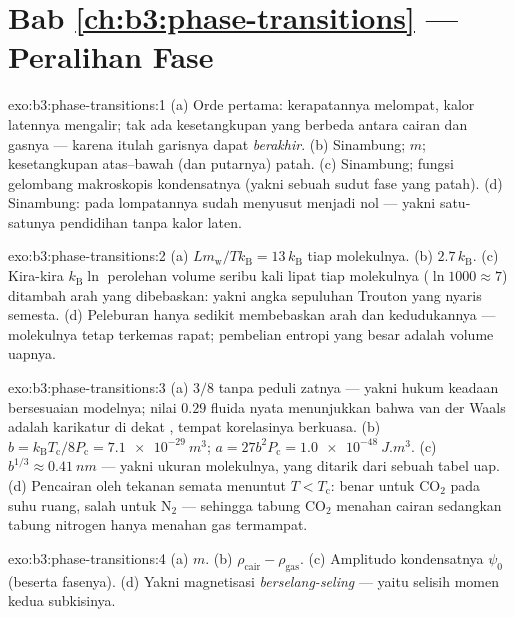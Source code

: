 \section*{Bab \ref{ch:b3:phase-transitions} --- Peralihan Fase}

\begin{solution}{exo:b3:phase-transitions:1}
(a) Orde pertama: kerapatannya melompat, kalor latennya mengalir; tak
ada kesetangkupan yang berbeda antara cairan dan gasnya --- karena
itulah garisnya dapat \emph{berakhir}. (b) Sinambung;  $m$; kesetangkupan atas--bawah (dan
putarnya) patah. (c) Sinambung; fungsi gelombang makroskopis
kondensatnya (yakni sebuah sudut fase yang patah). (d) Sinambung:
pada  lompatannya sudah menyusut menjadi nol --- yakni
satu-satunya pendidihan tanpa kalor laten.
\end{solution}

\begin{solution}{exo:b3:phase-transitions:2}
(a) $Lm_{\text{w}}/Tk_{\text{B}} = 13\,k_{\text{B}}$ tiap molekulnya.
(b) $2.7\,k_{\text{B}}$. (c) Kira-kira $k_{\text{B}}\ln$ perolehan
volume seribu kali lipat tiap molekulnya ($\ln1000 \approx 7$) ditambah
arah yang dibebaskan: yakni angka sepuluhan Trouton yang nyaris semesta. (d)
Peleburan hanya sedikit membebaskan arah dan kedudukannya --- molekulnya
tetap terkemas rapat; pembelian entropi yang besar adalah volume uapnya.
\end{solution}

\begin{solution}{exo:b3:phase-transitions:3}
(a) $3/8$ tanpa peduli zatnya --- yakni hukum keadaan bersesuaian
modelnya; nilai $0.29$ fluida nyata menunjukkan bahwa van der Waals adalah
karikatur di dekat , tempat korelasinya berkuasa. (b) $b =
k_{\text{B}}T_{\text{c}}/8P_{\text{c}} = \qty{7.1e-29}{m^3}$; $a =
27b^2P_{\text{c}} = \qty{1.0e-48}{J.m^3}$. (c) $b^{1/3} \approx
\qty{0.41}{nm}$ --- yakni ukuran molekulnya, yang ditarik dari sebuah
tabel uap. (d) Pencairan oleh tekanan semata menuntut $T <
T_{\text{c}}$: benar untuk CO$_2$ pada suhu ruang, salah untuk
N$_2$ --- sehingga tabung CO$_2$ menahan cairan sedangkan tabung nitrogen
hanya menahan gas termampat.
\end{solution}

\begin{solution}{exo:b3:phase-transitions:4}
(a) $m$. (b) $\rho_{\text{cair}} - \rho_{\text{gas}}$. (c) Amplitudo
kondensatnya $\psi_0$ (beserta fasenya). (d) Yakni magnetisasi
\emph{berselang-seling} --- yaitu selisih momen kedua
subkisinya.
\end{solution}


